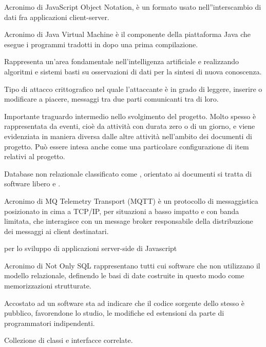 Acronimo di JavaScript Object Notation, \`e un formato usato nell''interscambio di dati fra applicazioni client-server.

Acronimo di Java Virtual Machine \`e il componente della piattaforma Java che esegue i programmi tradotti in  dopo una prima compilazione.
\clearpage

Rappresenta un'area fondamentale nell'intelligenza artificiale e realizzando algoritmi e sistemi basti su osservazioni di dati per la sintesi di nuova conoscenza.

Tipo di attacco crittografico nel quale l'attaccante \`e in grado di leggere, inserire o modificare a piacere, messaggi tra due parti comunicanti tra di loro.

Importante traguardo intermedio nello svolgimento del progetto. Molto spesso è rappresentata da eventi, cioè da attività con durata zero o di un giorno, e viene evidenziata in maniera diversa dalle altre attività nell'ambito dei documenti di progetto. Può essere intesa anche come una particolare configurazione di item relativi al progetto.

Database non relazionale classificato come , orientato ai documenti si tratta di software libero e .

Acronimo di MQ Telemetry Transport (MQTT) \`e un protocollo di messaggistica posizionato in cima a TCP/IP, per situazioni a basso impatto e con banda limitata, che interagisce con un message broker responsabile della distribuzione dei messaggi ai client destinatari.
\clearpage

 per lo sviluppo di applicazioni server-side di Javascript

Acronimo di Not Only SQL rappresentano tutti cui software che non utilizzano il modello relazionale, definendo le basi di date costruite in questo modo come memorizzazioni strutturate.
\clearpage

Accostato ad un software sta ad indicare che il codice sorgente dello stesso \`e pubblico, favorendone lo studio, le modifiche ed estensioni da parte di programmatori indipendenti.
\clearpage

Collezione di classi e interfacce correlate.


